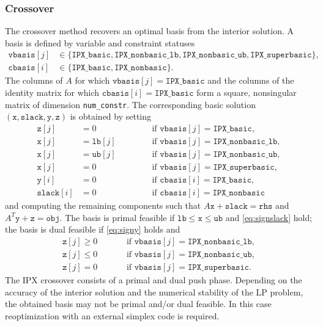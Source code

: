\documentclass{article}
\newcommand{\ct}{\texttt}
\newcommand{\rvec}[1]{\left(#1\right)}
\newcommand{\obj}{\ct{obj}}
\newcommand{\rhs}{\ct{rhs}}
\newcommand{\lb}{\ct{lb}}
\newcommand{\ub}{\ct{ub}}
\newcommand{\numconstr}{\ct{num\_constr}}
\newcommand{\x}{\ct{x}}
\newcommand{\slack}{\ct{slack}}
\newcommand{\y}{\ct{y}}
\newcommand{\z}{\ct{z}}
\newcommand{\vbasis}{\ct{vbasis}}
\newcommand{\cbasis}{\ct{cbasis}}
\newcommand{\basic}{\ct{IPX\_basic}}
\newcommand{\nonbasic}{\ct{IPX\_nonbasic}}
\newcommand{\nonbasiclb}{\ct{IPX\_nonbasic\_lb}}
\newcommand{\nonbasicub}{\ct{IPX\_nonbasic\_ub}}
\newcommand{\superbasic}{\ct{IPX\_superbasic}}
\begin{document}
\subsubsection*{Crossover}
The crossover method recovers an optimal basis from the interior solution. A
basis is defined by variable and constraint statuses
\begin{align}
  \vbasis[j] &\in \{\basic, \nonbasiclb, \nonbasicub, \superbasic\}, \\
  \cbasis[i] &\in \{\basic, \nonbasic\}.
\end{align}
The columns of $A$ for which $\vbasis[j]=\basic$ and the columns of the identity
matrix for which $\cbasis[i]=\basic$ form a square, nonsingular matrix of
dimension \numconstr. The corresponding basic solution $\rvec{\x,\slack,\y,\z}$
is obtained by setting
\begin{subequations}
  \begin{alignat}{3}
    \z[j]&=0& &\quad& &\text{if $\vbasis[j]=\basic$}, \\
    \x[j]&=\lb[j]& && &\text{if $\vbasis[j]=\nonbasiclb$}, \\
    \x[j]&=\ub[j]& && &\text{if $\vbasis[j]=\nonbasicub$}, \\
    \x[j]&=0& &&      &\text{if $\vbasis[j]=\superbasic$}, \\
    \y[i]&=0& &&      &\text{if $\cbasis[i]=\basic$}, \\
    \slack[i]&=0& &&  &\text{if $\cbasis[i]=\nonbasic$}
  \end{alignat}
\end{subequations}
and computing the remaining components such that $A\x+\slack=\rhs$ and
$A^T\y+\z=\obj$. The basis is primal feasible if $\lb\le\x\le\ub$ and
\eqref{eq:signslack} hold; the basis is dual feasible if \eqref{eq:signy} holds
and
\begin{subequations}
  \begin{alignat}{2}
    \z[j]\ge0 &\quad& &\text{if $\vbasis[j]=\nonbasiclb$}, \\
    \z[j]\le0 &\quad& &\text{if $\vbasis[j]=\nonbasicub$}, \\
    \z[j]=0 &\quad& &\text{if $\vbasis[j]=\superbasic$}.
  \end{alignat}
\end{subequations}
The IPX crossover consists of a primal and dual push phase. Depending on the
accuracy of the interior solution and the numerical stability of the LP problem,
the obtained basis may not be primal and/or dual feasible. In this case
reoptimization with an external simplex code is required.
\end{document}
